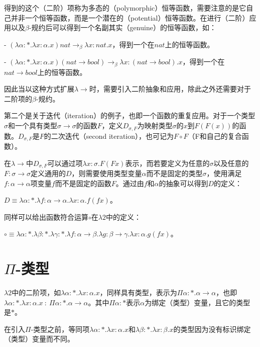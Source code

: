 \documentclass[UTF8]{article}
\begin{document}
		得到的这个（二阶）项称为多态的（polymorphic）恒等函数，需要注意的是它自己并非一个恒等函数，而是一个潜在的（potential）恒等函数。在进行（二阶）应用以及$\beta$-规约后可以得到一个名副其实（genuine）的恒等函数，如：
		
		\noindent
		- $(\lambda\alpha:*.\lambda x:\alpha.x)nat\rightarrow_\beta\lambda x:nat.x$，得到一个在$nat$上的恒等函数。
		
		\noindent
		- $(\lambda\alpha:*.\lambda x:\alpha.x)(nat\rightarrow bool)\rightarrow_\beta\lambda x:(nat\rightarrow bool).x$，得到一个在$nat\rightarrow bool$上的恒等函数。
		
		因此当以这种方式扩展$\lambda{\rightarrow}$时，需要引入二阶抽象和应用，除此之外还需要对于二阶项的$\beta$-规约。
		
		第二个是关于迭代（iteration）的例子，也即一个函数的重复应用。对于一个类型$\sigma$和一个具有类型$\sigma\rightarrow\sigma$的函数$F$，定义$D_{\sigma,F}$为映射类型$\sigma$的$x$到$F(F(x))$的函数。$D_{\sigma,F}$是$F$的二次迭代（second iteration），也可记为$F\circ F$（F和自己的复合函数）。
		
		在$\lambda{\rightarrow}$中$D_{\sigma,F}$可以通过项$\lambda x:\sigma.F(F x)$表示，而若要定义为任意的$\sigma$以及任意的$F:\sigma\rightarrow\sigma$定义通用的$D$，则需要使用类型变量$\alpha$而不是固定的类型$\sigma$，使用满足$f:\alpha\rightarrow\alpha$项变量$f$而不是固定的函数$F$。通过由$f$和$\alpha$的抽象可以得到$D$的定义：
		
		$D\equiv\lambda\alpha:*.\lambda f:\alpha\rightarrow\alpha.\lambda x:\alpha.f(fx)$。
		
		同样可以给出函数符合运算$\circ$在$\lambda{2}$中的定义：
		
		$\circ\equiv\lambda\alpha:*.\lambda\beta:*.\lambda\gamma:*.\lambda f:\alpha\rightarrow\beta.\lambda g:\beta\rightarrow\gamma.\lambda x:\alpha.g(fx)$。
		
	\section{$\Pi$-类型}
		$\lambda{2}$中的二阶项，如$\lambda\alpha:*.\lambda x:\alpha.x$，同样具有类型，表示为$\Pi\alpha:*.\alpha\rightarrow\alpha$，也即$\lambda\alpha:*.\lambda x:\alpha.x\ :\ \Pi\alpha:*.\alpha\rightarrow\alpha$。其中$\Pi\alpha:*$表示$\alpha$为绑定（类型）变量，且它的类型是$*$。
		
		在引入$\Pi$-类型之前，等同项$\lambda\alpha:*.\lambda x:\alpha.x$和$\lambda\beta:*.\lambda x:\beta.x$的类型因为没有标识绑定（类型）变量而不同。
	
\end{document}
